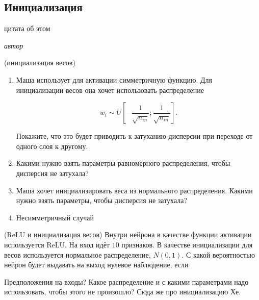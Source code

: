 \subsection{Инициализация}

\epigraph{цитата об этом}{\textit{автор}}


\begin{problem}{(инициализация весов)}
    \begin{enumerate}
        \item Маша использует для активации симметричную функцию. Для инициализации весов она хочет использовать распределение 
        
        $$
        w_i \sim U \left[ - \frac{1}{\sqrt{n_{in}}};  \frac{1}{\sqrt{n_{in}}}  \right].
        $$
        
        Покажите, что это будет приводить к затуханию дисперсии при переходе от одного слоя к другому. 
        
        \item Какими нужно взять параметры равномерного распределения, чтобы дисперсия не затухала? 
        
        \item Маша хочет инициализировать веса из нормального распределения. Какими нужно взять параметры, чтобы дисперсия не затухала? 
        
        \item Несимметричный случай
    \end{enumerate}
\end{problem}

\begin{problem}{(ReLU и инициализация весов)}
    Внутри нейрона в качестве функции активации используется ReLU. На вход идёт $10$ признаков. В качестве инициализации для весов используется нормальное распределение, $N(0,1)$. С какой вероятностью нейрон будет выдавать на выход нулевое наблюдение, если 
    
    Предположения на входы? Какое распределение и с какими параметрами надо использовать, чтобы этого не произошло? Сюда же про инициализацию Хе.
\end{problem}





